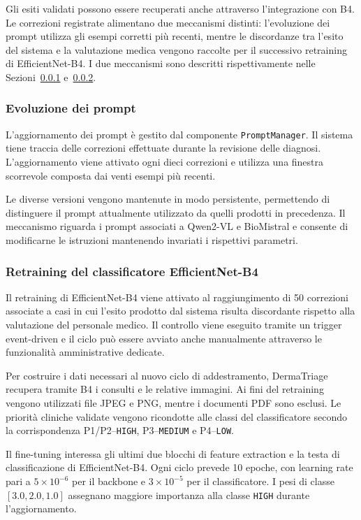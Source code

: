 Gli esiti validati possono essere recuperati anche attraverso l'integrazione con B4. Le correzioni registrate alimentano due meccanismi distinti: l'evoluzione dei prompt utilizza gli esempi corretti più recenti, mentre le discordanze tra l'esito del sistema e la valutazione medica vengono raccolte per il successivo retraining di EfficientNet-B4. I due meccanismi sono descritti rispettivamente nelle Sezioni~\ref{sec:evoluzione-prompt} e~\ref{sec:retraining-efficientnet}.

\subsubsection{Evoluzione dei prompt}
\label{sec:evoluzione-prompt}
L'aggiornamento dei prompt è gestito dal componente \texttt{PromptManager}. Il sistema tiene traccia delle correzioni effettuate durante la revisione delle diagnosi. L'aggiornamento viene attivato ogni dieci correzioni e utilizza una finestra scorrevole composta dai venti esempi più recenti.

Le diverse versioni vengono mantenute in modo persistente, permettendo di distinguere il prompt attualmente utilizzato da quelli prodotti in precedenza. Il meccanismo riguarda i prompt associati a Qwen2-VL e BioMistral e consente di modificarne le istruzioni mantenendo invariati i rispettivi parametri.

\subsubsection{Retraining del classificatore EfficientNet-B4}
\label{sec:retraining-efficientnet}
Il retraining di EfficientNet-B4 viene attivato al raggiungimento di 50 correzioni associate a casi in cui l'esito prodotto dal sistema risulta discordante rispetto alla valutazione del personale medico. Il controllo viene eseguito tramite un trigger event-driven e il ciclo può essere avviato anche manualmente attraverso le funzionalità amministrative dedicate.

Per costruire i dati necessari al nuovo ciclo di addestramento, DermaTriage recupera tramite B4 i consulti e le relative immagini. Ai fini del retraining vengono utilizzati file JPEG e PNG, mentre i documenti PDF sono esclusi. Le priorità cliniche validate vengono ricondotte alle classi del classificatore secondo la corrispondenza P1/P2--\texttt{HIGH}, P3--\texttt{MEDIUM} e P4--\texttt{LOW}.

Il fine-tuning interessa gli ultimi due blocchi di feature extraction e la testa di classificazione di EfficientNet-B4. Ogni ciclo prevede 10 epoche, con learning rate pari a $5 \times 10^{-6}$ per il backbone e $3 \times 10^{-5}$ per il classificatore. I pesi di classe $[3.0,2.0,1.0]$ assegnano maggiore importanza alla classe \texttt{HIGH}
durante l'aggiornamento.

